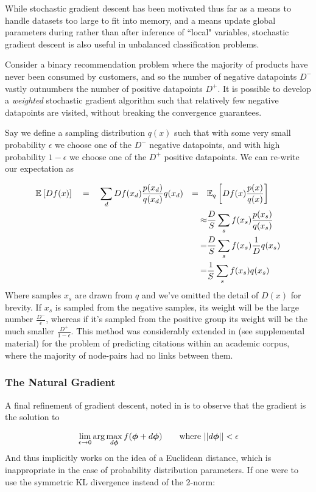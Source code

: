 While stochastic gradient descent has been motivated thus far as a means to handle datasets too large to fit into memory, and a means update global parameters during rather than after inference of ``local" variables, stochastic gradient descent is also useful in unbalanced classification problems.

Consider a binary recommendation problem where the majority of products have never been consumed by customers, and so the number of negative datapoints $D^-$ vastly outnumbers the number of positive datapoints $D^+$. It is possible to develop a \emph{weighted} stochastic gradient algorithm such that relatively few negative datapoints are visited, without breaking the convergence guarantees. 

Say we define a sampling distribution $q(x)$ such that with some very small probability $\epsilon$ we choose one of the $D^-$ negative datapoints, and with high probability $1 - \epsilon$ we choose one of the $D^+$ positive datapoints. We can re-write our expectation as

\begin{align*}
\ex{D f(x)}{} \quad
&= \quad \sum_d D f(x_d) \frac{p(x_d)}{q(x_d)} q(x_d) 
& = \quad & \ex{D f(x) \frac{p(x)}{q(x)}}{q} \\
& & \approx & \frac{D}{S} \sum_s f(x_s) \frac{p(x_s)}{q(x_s)} \\
& & = & \frac{D}{S} \sum_s f(x_s) \frac{1}{D}q(x_s) \\
& & = & \frac{1}{S} \sum_s f(x_s) q(x_s)
\end{align*}
Where samples $x_s$ are drawn from $q$ and we've omitted the detail of $D(x)$ for brevity. If $x_s$ is sampled from the negative samples, its weight will be the large number $\frac{D^-}{\epsilon}$, whereas if it's sampled from the positive group its weight will be the much smaller $\frac{D^+}{1 - \epsilon}$. This method was considerably extended in \cite{Gopalan2013b} (see supplemental material) for the problem of predicting citations within an academic corpus, where the majority of node-pairs had no links between them.

\subsubsection*{The Natural Gradient}
A final refinement of gradient descent, noted in \cite{Hoffman2012} is to observe that the gradient is the solution to

\begin{align*}
\lim_{\epsilon \rightarrow 0} \arg \max_{d\param} f(\param + d\param) \qquad \text{where } ||d\param|| < \epsilon
\end{align*}
And thus implicitly works on the idea of a Euclidean distance, which is inappropriate in the case of probability distribution parameters. If one were to use the symmetric KL divergence instead of the 2-norm:

